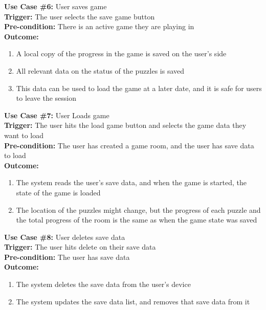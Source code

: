 \documentclass[12pt]{article}
\begin{document}
\textbf{Use Case \#6:} User saves game\\
\textbf{Trigger:} The user selects the save game button\\
\textbf{Pre-condition:} There is an active game they are playing in\\
\textbf{Outcome:}
\begin{enumerate}
	\item A local copy of the progress in the game is saved on the user's side
    \item All relevant data on the status of the puzzles is saved
    \item This data can be used to load the game at a later date, and it is safe for users to leave the session
\end{enumerate}
\textbf{Use Case \#7:} User Loads game\\
\textbf{Trigger:} The user hits the load game button and selects the game data they want to load\\
\textbf{Pre-condition:} The user has created a game room, and the user has save data to load\\
\textbf{Outcome:}
\begin{enumerate}
	\item The system reads the user's save data, and when the game is started, the state of the game is loaded
    \item The location of the puzzles might change, but the progress of each puzzle and the total progress of the room is the same as when the game state was saved 
\end{enumerate}
\textbf{Use Case \#8:} User deletes save data\\
\textbf{Trigger:} The user hits delete on their save data\\
\textbf{Pre-condition:} The user has save data\\
\textbf{Outcome:}
\begin{enumerate}
	\item The system deletes the save data from the user's device
    \item The system updates the save data list, and removes that save data from it
\end{enumerate}
\end{document}
